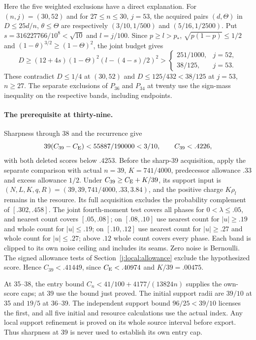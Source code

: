 Here the five weighted exclusions have a direct explanation.
For $(n,j)=(30,52)$ and for $27\le n\le30$, $j=53$, the acquired
pairs $(d,\Theta)$ in $D\le25d/n$, $\theta\le\Theta$ are respectively
$(3/10,1/500)$ and $(5/16,1/2500)$. Put
$s=316227766/10^8<\sqrt{10}$ and $l=j/100$. Since
$p\ge l>p_*$, $\sqrt{p(1-p)}\le1/2$ and
$(1-\theta)^{3/2}\ge(1-\Theta)^2$, the joint budget gives
\[
 D\ge(12+4s)(1-\Theta)^2(l-(4-s)/2)^2
 >\begin{cases}251/1000,&j=52,\\38/125,&j=53.\end{cases}
\]
These contradict $D\le1/4$ at $(30,52)$ and
$D\le125/432<38/125$ at $j=53$, $n\ge27$.
The separate exclusions of $P_{36}$ and $P_{34}$ at twenty use
the sign-mass inequality on the respective bands, including endpoints.

\paragraph{The prerequisite at thirty-nine.}
Sharpness through 38 and the recurrence give
\[
 39(C_{39}-C_{\mathrm E})<55887/190000<3/10,\qquad C_{39}<.4226,
\]
with both deleted scores below $.4253$. Before the sharp-39 acquisition,
apply the separate comparison with actual $n=39$, $K=741/4000$,
predecessor allowance $.33$ and excess allowance $1/2$.
Under $C_{39}\ge C_{\mathrm E}+K/39$, its support input is
$(N,L,K,q,R)=(39,39,741/4000,.33,3.84)$, and the positive charge
$K\rho_l$ remains in the resource. Its full acquisition excludes the
probability complement of $[.302,.458]$.
The joint fourth-moment test covers all phases for $0<\lambda\le.05$,
and nearest count covers $[.05,.08]$; on
$[.08,.10]$ use nearest count for $|u|\ge.19$ and whole count for
$|u|\le.19$; on $[.10,.12]$ use nearest count for $|u|\ge.27$
and whole count for $|u|\le.27$;
above $.12$ whole count covers every phase. Each band is clipped to its
own noise ceiling and includes its seams. Zero noise is Bernoulli.
The signed allowance tests of Section~\ref{j:local:allowance} exclude
the hypothesized score. Hence $C_{39}<.41449$, since
$C_{\mathrm E}<.40974$ and $K/39=.00475$.

At 35--38, the entry bound
$C_n<41/100+4177/(13824n)$ supplies the own-score caps; at 39 use
the bound just proved. The initial support radii are $39/10$ at 35
and $19/5$ at 36--39. The independent support bound $96/25<39/10$
licenses the first, and all five initial and resource calculations
use the actual index. Any local support refinement is proved on its
whole source interval before export. Thus sharpness at 39 is never
used to establish its own entry cap.

